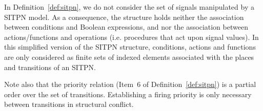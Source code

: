 
In Definition~\ref{def:sitpn}, we do not consider the set of \vhdl{}
signals manipulated by a SITPN model. As a consequence, the structure
holds neither the association between conditions and Boolean
expressions, and nor the association between actions/functions and
operations (i.e. \vhdl{} procedures that act upon signal values).  In
this simplified version of the SITPN structure, conditions, actions
and functions are only considered as finite sets of indexed elements
associated with the places and transitions of an SITPN.

Note also that the priority relation (Item~6 of
Definition~\ref{def:sitpn}) is a partial order over the set of
transitions. Establishing a firing priority is only necessary between
transitions in structural conflict.





